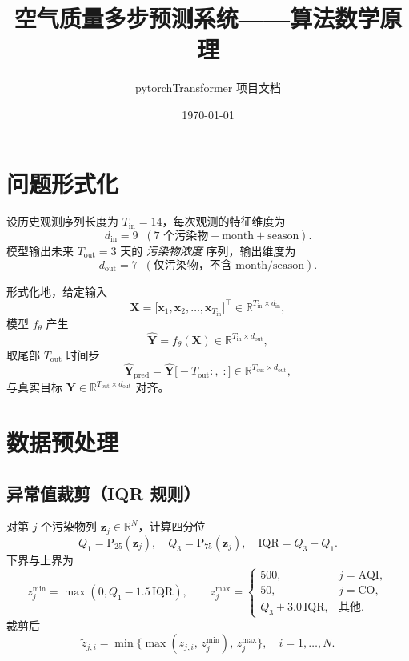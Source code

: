 \documentclass[11pt,a4paper]{article}
\title{\bfseries 空气质量多步预测系统——算法数学原理}
\author{pytorchTransformer 项目文档}
\date{\today}
\newcommand{\R}{\mathbb{R}}
\newcommand{\mat}[1]{\bm{#1}}
\newcommand{\vect}[1]{\bm{#1}}
\begin{document}
\maketitle
\tableofcontents
\newpage

\section{问题形式化}
设历史观测序列长度为 $T_{\text{in}} = 14$，每次观测的特征维度为
\[
d_{\text{in}} = 9 \;\;(\text{7 个污染物} + \text{month} + \text{season}) .
\]
模型输出未来 $T_{\text{out}} = 3$ 天的 \emph{污染物浓度} 序列，输出维度为
\[
d_{\text{out}} = 7 \;\;(\text{仅污染物，不含 month/season}) .
\]

形式化地，给定输入
\[
\mat{X} = \bigl[\vect{x}_1, \vect{x}_2, \dots, \vect{x}_{T_{\text{in}}}\bigr]^{\top} \in \R^{T_{\text{in}} \times d_{\text{in}}},
\]
模型 $f_{\theta}$ 产生
\[
\widehat{\mat{Y}} = f_{\theta}(\mat{X}) \in \R^{T_{\text{in}} \times d_{\text{out}}},
\]
取尾部 $T_{\text{out}}$ 时间步
\[
\widehat{\mat{Y}}_{\text{pred}} = \widehat{\mat{Y}}\bigl[-T_{\text{out}}:,\; :\bigr] \in \R^{T_{\text{out}} \times d_{\text{out}}},
\]
与真实目标 $\mat{Y} \in \R^{T_{\text{out}} \times d_{\text{out}}}$ 对齐。

\section{数据预处理}

\subsection{异常值裁剪（IQR 规则）}
对第 $j$ 个污染物列 $\vect{z}_j \in \R^N$，计算四分位
\[
Q_1 = \mathrm{P}_{25}(\vect{z}_j), \quad Q_3 = \mathrm{P}_{75}(\vect{z}_j), \quad \mathrm{IQR} = Q_3 - Q_1 .
\]
下界与上界为
\[
z_j^{\min} = \max(0, Q_1 - 1.5\,\mathrm{IQR}),\qquad
z_j^{\max} =
\begin{cases}
500, & j = \text{AQI}, \\
50,  & j = \text{CO}, \\
Q_3 + 3.0\,\mathrm{IQR}, & \text{其他}.
\end{cases}
\]
裁剪后
\[
\widetilde{z}_{j,i} = \min\bigl\{\max(z_{j,i},\,z_j^{\min}),\,z_j^{\max}\bigr\},\quad i = 1,\dots,N.
\]
\end{document}
